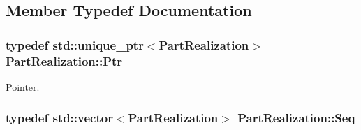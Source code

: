 \subsection{Member Typedef Documentation}
\hypertarget{class_part_realization_aec2d1af3a61dba0792d0d95bf32e7118}{
\subsubsection[{Ptr}]{\setlength{\rightskip}{0pt plus 5cm}typedef std\-::unique\-\_\-ptr$<${\bf Part\-Realization}$>$ {\bf Part\-Realization\-::\-Ptr}}}\label{class_part_realization_aec2d1af3a61dba0792d0d95bf32e7118}


Pointer. 

\hypertarget{class_part_realization_ac53d0830ece33a44aaf825f109e00f59}{
\subsubsection[{Seq}]{\setlength{\rightskip}{0pt plus 5cm}typedef std\-::vector$<${\bf Part\-Realization}$>$ {\bf Part\-Realization\-::\-Seq}}}\label{class_part_realization_ac53d0830ece33a44aaf825f109e00f59}


